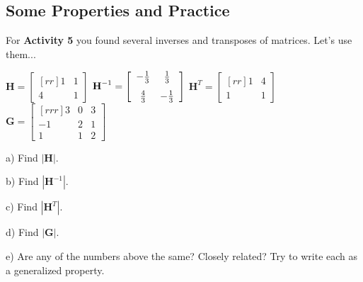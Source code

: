 \documentclass{article}
\begin{document}
\begin{flushleft}
\newpage


\section{Some Properties and Practice}

For \textbf{Activity 5} you found several inverses and transposes of matrices. Let's use them...

\begin{center}
$\textbf{H}=\begin{bmatrix}[rr]
1 & 1\\
4  & 1
\end{bmatrix}$
\hspace{0.5in}
$\textbf{H}^{-1}=\left[
\begin{array}{cc}
- \frac{1}{3} & \frac{1}{3} \vspace{0.1in}\\

\frac{4}{3} & - \frac{1}{3}
\end{array} \right]$
\hspace{0.5in}
$
\textbf{H}^{T}=\begin{bmatrix}[rr]
1 & 4\\
1  & 1
\end{bmatrix}$
\hspace{0.5in}
$\textbf{G}=
\begin{bmatrix}[rrr]
3 & 0 & 3\\
-1 & 2 & 1\\
1 & 1 & 2
\end{bmatrix}$\\
\end{center}

\vspace{0.1in}

a) Find $|\textbf{H}|$.

\vspace{1in}

b) Find $|\textbf{H}^{-1}|$.

\vspace{1in}

c) Find $|\textbf{H}^{T}|$.

\vspace{1in}

d) Find $|\textbf{G}|$.

\vspace{1in}

e) Are any of the numbers above the same? Closely related? Try to write each as a generalized property.


\end{flushleft}
\end{document}
